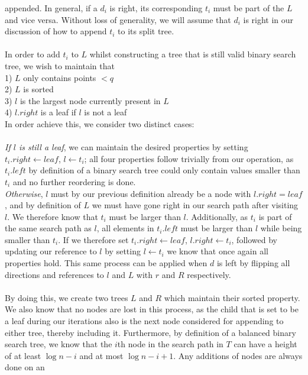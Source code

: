\documentclass{article}
\newcommand{\fb}[1]{{#1}}
\begin{document}
appended. In general, if a $d_i$ is right, its corresponding $t_i$ must be part
of the $L$ and vice versa. Without loss of generality, we will assume that
$d_i$ is right in our discussion of how to append $t_i$ to its split tree. \\\\
In order to add $t_i$ to $L$ whilst constructing a tree that is still valid
binary search tree, we wish to maintain that \\ 1) $L$ only contains points $<
    q$ \\ 2) $L$ is sorted \\ 3) $l$ is the largest node currently present in $L$
\\ 4) $l.right$ is a leaf if $l$ is not a leaf \\ In order achieve this, we
consider two distinct cases: \\\\ \textit{If $l$ is still a leaf}, we can
maintain the desired properties by setting $t_i.right \leftarrow leaf$, $l
    \leftarrow t_i$; all four properties follow trivially from our operation, as
$t_i.left$ by definition of a binary search tree could only contain values
smaller than $t_i$ and no further reordering is done. \\ \textit{Otherwise},
$l$ must by our previous definition already be a node with $l.right = leaf$,
and by definition of $L$ we must have gone right in our search path after
visiting $l$. We therefore know that $t_i$ must be larger than $l$.
Additionally, as $t_i$ is part of the same search path as $l$, all elements in
$t_i.left$ must be larger than $l$ while being smaller than $t_i$. If we
therefore set $t_{\fb{i}}.right \leftarrow leaf$, $l.right \leftarrow t_{\fb{i}}$, followed by
updating our reference to $l$ by setting $l \leftarrow t_{\fb{i}}$ we know that once
again all properties hold. This same process can be applied when $d$ is left by
flipping all directions and references to $l$ and $L$ with $r$ and $R$
respectively. \\\\ By doing this, we create two trees $L$ and $R$ which
maintain their sorted property. We also know that no nodes are lost in this
process, as the child that is set to be a leaf during our iterations also is
the next node considered for appending to either tree, thereby including it.
Furthermore, by definition of a balanced binary search tree, we know that the
$i$th node in the search path in $T$ can have a height of at least $\log n - i$
and at most $\log n - i + 1$. Any additions of nodes are always done on an
\end{document}
